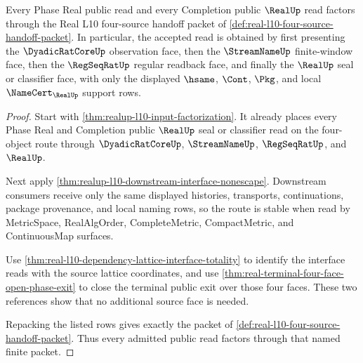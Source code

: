 \begin{theorem}
\label{thm:real-l10-four-source-handoff-totality}
Every Phase Real public read and every Completion public $\RealUp$ read factors through the Real L10 four-source handoff packet of \autoref{def:real-l10-four-source-handoff-packet}. In particular, the accepted read is obtained by first presenting the $\DyadicRatCoreUp$ observation face, then the $\StreamNameUp$ finite-window face, then the $\RegSeqRatUp$ regular readback face, and finally the $\RealUp$ seal or classifier face, with only the displayed $\hsame$, $\Cont$, $\Pkg$, and local $\NameCert_{\RealUp}$ support rows.
\end{theorem}
\begin{proof}
Start with \autoref{thm:realup-l10-input-factorization}. It already places every Phase Real and Completion public $\RealUp$ seal or classifier read on the four-object route through $\DyadicRatCoreUp$, $\StreamNameUp$, $\RegSeqRatUp$, and $\RealUp$.

Next apply \autoref{thm:realup-l10-downstream-interface-nonescape}. Downstream consumers receive only the same displayed histories, transports, continuations, package provenance, and local naming rows, so the route is stable when read by MetricSpace, RealAlgOrder, CompleteMetric, CompactMetric, and ContinuousMap surfaces.

Use \autoref{thm:real-l10-dependency-lattice-interface-totality} to identify the interface reads with the source lattice coordinates, and use \autoref{thm:real-terminal-four-face-open-phase-exit} to close the terminal public exit over those four faces. These two references show that no additional source face is needed.

Repacking the listed rows gives exactly the packet of \autoref{def:real-l10-four-source-handoff-packet}. Thus every admitted public read factors through that named finite packet.
\end{proof}


